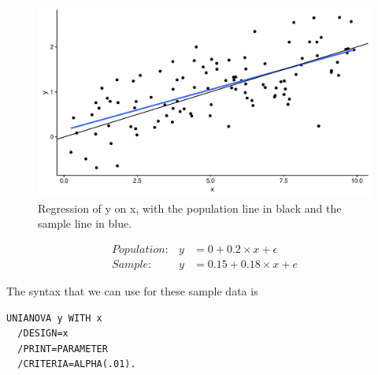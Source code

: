 \documentclass[]{book}\usepackage[]{graphicx}\usepackage[]{color}
\makeatletter
\def\maxwidth{ %
  \ifdim\Gin@nat@width>\linewidth
    \linewidth
  \else
    \Gin@nat@width
  \fi
}
\newenvironment{knitrout}{}{} %
\makeatother
\begin{document}
\begin{knitrout}
\color{fgcolor}\begin{figure}

{\centering \includegraphics[width=\maxwidth]{figure/inf_28-1} 

}

\caption[Regression of y on x, with the population line in black and the sample line in blue]{Regression of y on x, with the population line in black and the sample line in blue.}\label{fig:inf_28}
\end{figure}


\end{knitrout}

\begin{eqnarray}
Population: &y&= 0 + 0.2 \times x + \epsilon\\
Sample: &y&= 0.15 + 0.18\times x + e
\end{eqnarray}

The syntax that we can use for these sample data is

\begin{verbatim}
UNIANOVA y WITH x
  /DESIGN=x
  /PRINT=PARAMETER
  /CRITERIA=ALPHA(.01).
\end{verbatim}
\end{document}
